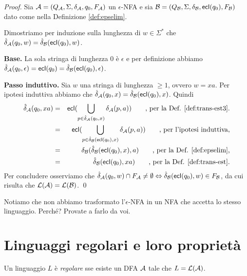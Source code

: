 \documentclass[runningheads,a4paper]{llncs}
\begin{document}
\begin{proof}
Sia $\mathcal{A} = (Q_{\mathcal{A}},\Sigma,\delta_{\mathcal{A}},q_0,F_{\mathcal{A}})$ un $\epsilon$-NFA e sia $\mathcal{B} = (Q_{\mathcal{B}},\Sigma,\delta_{\mathcal{B}},\mathsf{ecl}(q_0),F_{\mathcal{B}})$ dato come nella Definizione \ref{def:epselim}. 

Dimostriamo per induzione sulla lunghezza di $w \in \Sigma^*$ che $\hat{\delta}_{\mathcal{A}}(q_0,w) = \hat{\delta}_{\mathcal{B}}(\mathsf{ecl}(q_0),w)$.

\noindent\textbf{Base.} La sola stringa di lunghezza $0$ \`{e} $\epsilon$ e per definizione abbiamo $\hat{\delta}_{\mathcal{A}}(q_0,\epsilon) = \mathsf{ecl}(q_0) = \hat{\delta}_{\mathcal{B}}(\mathsf{ecl}(q_0),\epsilon)$.

\noindent\textbf{Passo induttivo.} Sia $w$ una stringa di lunghezza $\geq 1$, ovvero $w = xa$. Per ipotesi induttiva abbiamo che $\hat{\delta}_{\mathcal{A}}(q_0,x) = \hat{\delta}_{\mathcal{B}}(\mathsf{ecl}(q_0),x)$. Quindi
\begin{eqnarray*}
\hat{\delta}_{\mathcal{A}}(q_0,xa) & = & \mathsf{ecl}(\bigcup_{p \in \hat{\delta}_{\mathcal{A}}(q_0,x)} \delta_{\mathcal{A}}(p,a)) \qquad \mbox{, per la Def. \ref{def:trans-est3}.} \\
& = & \mathsf{ecl}( \bigcup_{p \in \hat{\delta}_{\mathcal{B}}(\mathsf{ecl}(q_0),x)} \delta_{\mathcal{A}}(p,a) ) \qquad \mbox{, per l'ipotesi induttiva,} \\
& = & \delta_{\mathcal{B}}(\hat{\delta}_{\mathcal{B}}(\mathsf{ecl}(q_0),x),a) \qquad \mbox{, per la Def. \ref{def:epselim},} \\
& = & \hat{\delta}_{\mathcal{B}}(\mathsf{ecl}(q_0),xa) \qquad \mbox{, per la Def. \ref{def:trans-est}.}
\end{eqnarray*}
Per concludere osserviamo che $\hat{\delta}_{\mathcal{A}}(q_0,w) \cap F_{\mathcal{A}} \neq \emptyset \Leftrightarrow \hat{\delta}_{\mathcal{B}}(\mathsf{ecl}(q_0),w) \in F_{\mathcal{B}}$, da cui risulta che $\mathcal{L}(\mathcal{A}) = \mathcal{L}(\mathcal{B})$.
\qed\end{proof}

Notiamo che non abbiamo trasformato l'$\epsilon$-NFA in un NFA che accetta lo stesso linguaggio. Perch\'{e}? Provate a farlo da voi.

\section{Linguaggi regolari e loro propriet\`{a}}

\begin{definition}\label{def:ling-reg}
Un linguaggio $L$ \`{e} \emph{regolare} sse esiste un DFA $\mathcal{A}$ tale che $L = \mathcal{L}(\mathcal{A})$.
\end{definition}
\end{document}
